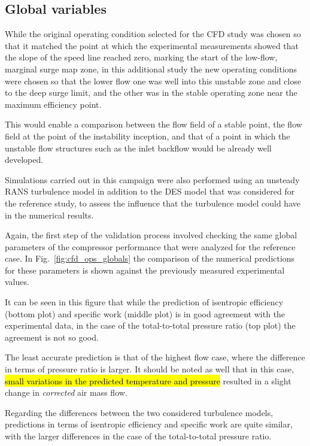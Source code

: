 \subsection{Global variables}

While the original operating condition selected for the CFD study was chosen so that it matched the point at which the experimental measurements showed that the slope of the speed line reached zero, marking the start of the low-flow, marginal surge map zone, in this additional study the new operating conditions were chosen so that the lower flow one was well into this unstable zone and close to the deep surge limit, and the other was in the stable operating zone near the maximum efficiency point.

This would enable a comparison between the flow field of a stable point, the flow field at the point of the instability inception, and that of a point in which the unstable flow structures such as the inlet backflow would be already well developed. 

Simulations carried out in this campaign were also performed using an unsteady RANS turbulence model in addition to the DES model that was considered for the reference study, to assess the influence that the turbulence model could have in the numerical results.

Again, the first step of the validation process involved checking the same global parameters of the compressor performance that were analyzed for the reference case. In Fig.~\ref{fig:cfd_ops_globals} the comparison of the numerical predictions for these parameters is shown against the previously measured experimental values.  

It can be seen in this figure that while the prediction of isentropic efficiency (bottom plot) and specific work (middle plot) is in good agreement with the experimental data, in the case of the total-to-total pressure ratio (top plot) the agreement is not so good.

The least accurate prediction is that of the highest flow case, where the difference in terms of pressure ratio is larger. It should be noted as well that in this case, \hl{small variations in the predicted temperature and pressure} resulted in a slight change in \textit{corrected} air mass flow.

Regarding the differences between the two considered turbulence models, predictions in terms of isentropic efficiency and specific work are quite similar, with the larger differences in the case of the total-to-total pressure ratio. 

